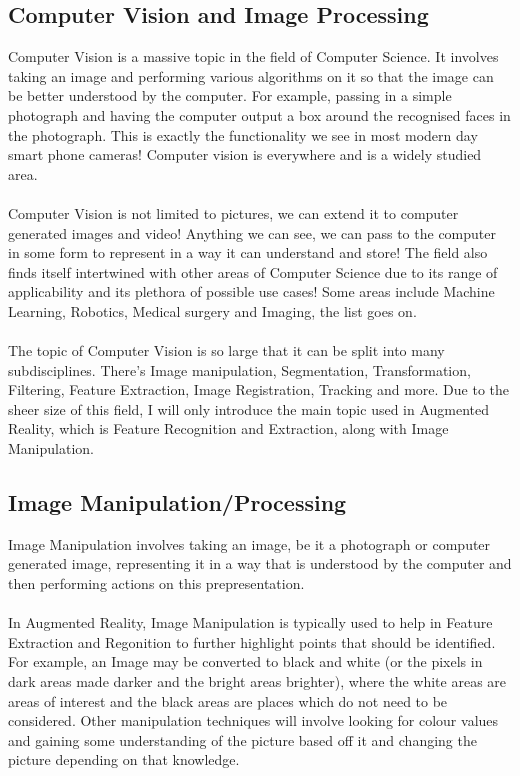 \documentclass[11pt]{article}
\begin{document}
\subsection{Computer Vision and Image Processing}
Computer Vision is a massive topic in the field of Computer Science. It
involves taking an image and performing various algorithms on it so that
the image can be better understood by the computer. For example,
passing in a simple photograph and having the computer output a box
around the recognised faces in the photograph. This is exactly the
functionality we see in most modern day smart phone cameras! Computer
vision is everywhere and is a widely studied area.\\
\\
Computer Vision is not limited to pictures, we can extend it to 
computer generated images and video! Anything we can see, we can pass to 
the computer in some form to represent in a way it can understand and
store! The field also finds itself intertwined with other areas of
Computer Science due to its range of applicability and its plethora
of possible use cases! Some areas include Machine Learning, Robotics,
Medical surgery and Imaging, the list goes on.\\
\\
The topic of Computer Vision is so large that it can be split into
many subdisciplines. There's Image manipulation, Segmentation, 
Transformation, Filtering, Feature Extraction, Image Registration,
Tracking and more. Due to the sheer size of this field, I will only 
introduce the main topic used in Augmented Reality, which is Feature 
Recognition and Extraction, along with Image Manipulation.

\subsection{Image Manipulation/Processing}
Image Manipulation involves taking an image, be it a photograph or 
computer generated image, representing it in a way that is understood
by the computer and then performing actions on this prepresentation.\\
\\
In Augmented Reality, Image Manipulation is typically used to help in
Feature Extraction and Regonition to further highlight points that should
be identified. For example, an Image may be converted to black and white
(or the pixels in dark areas made darker and the bright areas brighter),
where the white areas are areas of interest and the black areas are places
which do not need to be considered. Other manipulation techniques will
involve looking for colour values and gaining some understanding of
the picture based off it and changing the picture depending on that 
knowledge.
\end{document}
